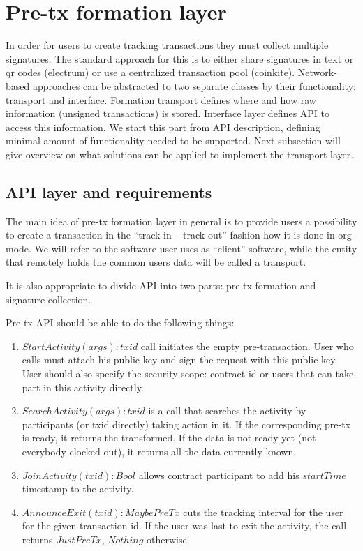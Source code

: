 \documentclass[]{itmo-student-thesis}
\begin{document}
\section{Pre-tx formation layer}

In order for users to create tracking transactions they must collect
multiple signatures. The standard approach for this is to either share
signatures in text or qr codes (electrum) or use a centralized
transaction pool (coinkite). Network-based approaches can be
abstracted to two separate classes by their functionality: transport
and interface. Formation transport defines where and how raw
information (unsigned transactions) is stored. Interface layer defines
API to access this information. We start this part from API
description, defining minimal amount of functionality needed to be
supported. Next subsection will give overview on what solutions can be
applied to implement the transport layer.

\subsection{API layer and requirements}

The main idea of pre-tx formation layer in general is to provide users
a possibility to create a transaction in the “track in -- track out”
fashion how it is done in org-mode. We will refer to the software user
uses as “client” software, while the entity that remotely holds the
common users data will be called a transport.

It is also appropriate to divide API into two parts: pre-tx formation
and signature collection.

Pre-tx API should be able to do the following things:

\begin{enumerate}
\item $StartActivity(args) : txid$ call initiates the empty
  pre-transaction. User who calls must attach his public key and sign
  the request with this public key. User should also specify the
  security scope: contract id or users that can take part in this
  activity directly.
\item $SearchActivity(args) : txid$ is a call that searches the
  activity by participants (or txid directly) taking action in it. If
  the corresponding pre-tx is ready, it returns the transformed. If
  the data is not ready yet (not everybody clocked out), it returns
  all the data currently known.
\item $JoinActivity(txid) : Bool$ allows contract participant to add his
  $startTime$ timestamp to the activity.
\item $AnnounceExit(txid) : Maybe PreTx$ cuts the tracking interval
  for the user for the given transaction id. If the user was last to
  exit the activity, the call returns $Just PreTx$, $Nothing$ otherwise.
\end{enumerate}
\end{document}
